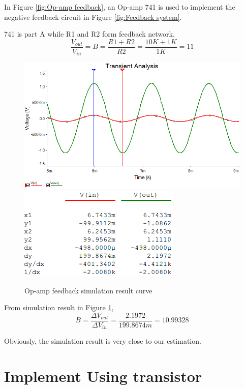 In Figure \ref{fig:Op-amp feedback}, an Op-amp 741 is used to implement the negative feedback circuit in Figure \ref{fig:Feedback system}.

741 is part A while R1 and R2 form feedback network. 
\[ \frac{V_{out}}{V_{in}} = B = \frac{R1 + R2}{R2} = \frac{10K + 1K}{1K} = 11 \]
 
\begin{figure}[htbp]
	\centering 
	\includegraphics[scale=0.6]{"../Photo/Chap2/Op-amp feedback simulation wave"}\\[0.5cm]
	\includegraphics[scale =1]{"../Photo/Chap2/Op-amp feedback simulation cursor data"}
	\caption{Op-amp  feedback simulation result curve}
	\label{fig:Op-amp  feedback simulation result }
\end{figure}

From simulation result in Figure \ref{fig:Op-amp  feedback simulation result }, 
\[ B = \frac{\Delta V_{out}}{\Delta V_{in}} =  \frac{2.1972}{199.8674m} =  10.99328 \]
 
Obviously, the simulation result is very close to our estimation.


\section{Implement Using transistor}


